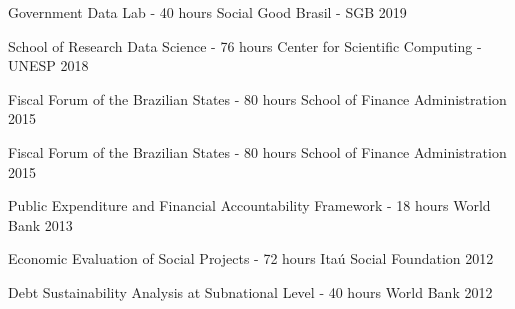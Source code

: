 \begin{cvhonors}

  \cvhonor
    {Government Data Lab - 40 hours}
    {Social Good Brasil - SGB}
    {}
    {2019}
 
  \cvhonor
    {School of Research Data Science - 76 hours}
    {Center for Scientific Computing - UNESP}
    {}
    {2018}

  \cvhonor
    {Fiscal Forum of the Brazilian States - 80 hours}
    {School of Finance Administration}
    {}
    {2015}

  \cvhonor
    {Fiscal Forum of the Brazilian States - 80 hours}
    {School of Finance Administration}
    {}
    {2015}

  \cvhonor
    {Public Expenditure and Financial Accountability Framework - 18 hours}
    {World Bank}
    {}
    {2013}

  \cvhonor
    {Economic Evaluation of Social Projects - 72 hours}
    {Itaú Social Foundation}
    {}
    {2012}

\cvhonor
    {Debt Sustainability Analysis at Subnational Level - 40 hours}
    {World Bank}
    {}
    {2012}

\end{cvhonors}